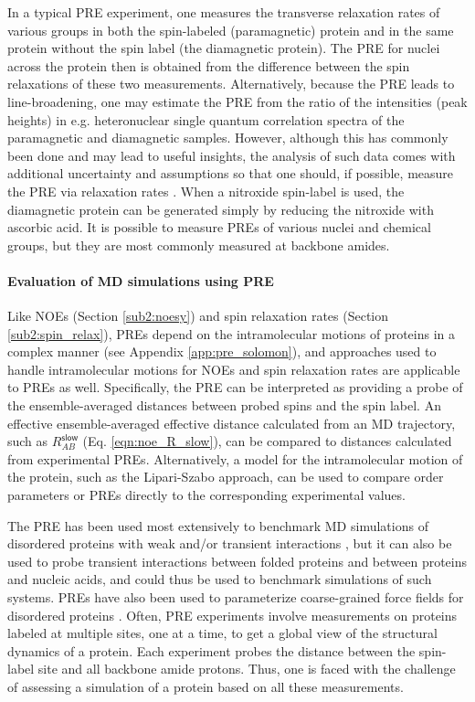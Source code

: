 \documentclass[9pt,review]{livecoms}
\begin{document}
In a typical PRE experiment, one measures the transverse relaxation rates of various groups in both the spin-labeled (paramagnetic) protein and in the same protein without the spin label (the diamagnetic protein).
The PRE for nuclei across the protein then is obtained from the difference between the spin relaxations of these two measurements.
Alternatively, because the PRE leads to line-broadening, one may estimate the PRE from the ratio of the intensities (peak heights) in e.g. heteronuclear single quantum correlation spectra of the paramagnetic and diamagnetic samples.
However, although this has commonly been done and may lead to useful insights, the analysis of such data comes with additional uncertainty and assumptions so that one should, if possible, measure the PRE via relaxation rates \cite{clore2009theory}.
When a nitroxide spin-label is used, the diamagnetic protein can be generated simply by reducing the nitroxide with ascorbic acid.
It is possible to measure PREs of various nuclei and chemical groups, but they are most commonly measured at backbone amides.

\paragraph{Evaluation of MD simulations using PRE}

Like NOEs (Section \ref{sub2:noesy}) and spin relaxation rates (Section \ref{sub2:spin_relax}), PREs depend on the intramolecular motions of proteins in a complex manner (see Appendix \ref{app:pre_solomon}), and approaches used to handle intramolecular motions for NOEs and spin relaxation rates are applicable to PREs as well.
Specifically, the PRE can be interpreted as providing a probe of the ensemble-averaged distances between probed spins and the spin label.
An effective ensemble-averaged effective distance calculated from an MD trajectory, such as $R_{AB}^{\mathsf{slow}}$ (Eq. \ref{eqn:noe_R_slow}), can be compared to distances calculated from experimental PREs.
Alternatively, a model for the intramolecular motion of the protein, such as the Lipari-Szabo approach, can be used to compare order parameters or PREs directly to the corresponding experimental values.

The PRE has been used most extensively to benchmark MD simulations of disordered proteins with weak and/or transient interactions \cite{piana_water_2015,robustelli_developing_2018}, but it can also be used to probe transient interactions between folded proteins and between proteins and nucleic acids, and could thus be used to benchmark simulations of such systems.
PREs have also been used to parameterize coarse-grained force fields for disordered proteins \cite{norgaard2008experimental,tesei2021accurate}.
Often, PRE experiments involve measurements on proteins labeled at multiple sites, one at a time, to get a global view of the structural dynamics of a protein.
Each experiment probes the distance between the spin-label site and all backbone amide protons.
Thus, one is faced with the challenge of assessing a simulation of a protein based on all these measurements.
\end{document}
